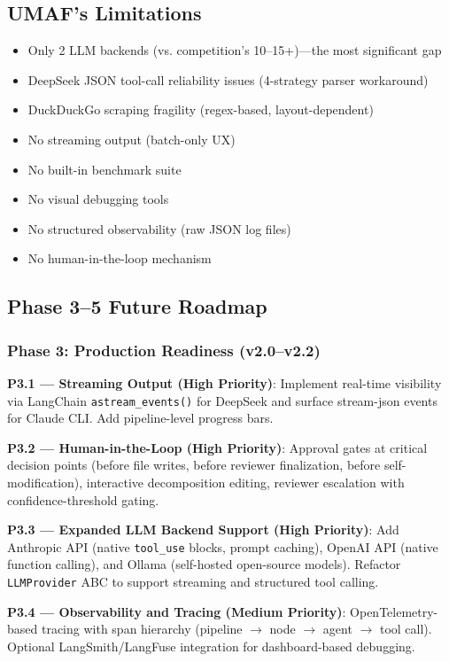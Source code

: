 \subsection{UMAF's Limitations}

\begin{itemize}
    \item Only 2 LLM backends (vs. competition's 10--15+)---the most significant gap
    \item DeepSeek JSON tool-call reliability issues (4-strategy parser workaround)
    \item DuckDuckGo scraping fragility (regex-based, layout-dependent)
    \item No streaming output (batch-only UX)
    \item No built-in benchmark suite
    \item No visual debugging tools
    \item No structured observability (raw JSON log files)
    \item No human-in-the-loop mechanism \cite{defection}
\end{itemize}

\subsection{Phase 3--5 Future Roadmap}

\subsubsection{Phase 3: Production Readiness (v2.0--v2.2)}

\textbf{P3.1 --- Streaming Output (High Priority)}: Implement real-time visibility via LangChain \texttt{astream\_events()} for DeepSeek and surface stream-json events for Claude CLI. Add pipeline-level progress bars.

\textbf{P3.2 --- Human-in-the-Loop (High Priority)}: Approval gates at critical decision points (before file writes, before reviewer finalization, before self-modification), interactive decomposition editing, reviewer escalation with confidence-threshold gating.

\textbf{P3.3 --- Expanded LLM Backend Support (High Priority)}: Add Anthropic API (native \texttt{tool\_use} blocks, prompt caching), OpenAI API (native function calling), and Ollama (self-hosted open-source models). Refactor \texttt{LLMProvider} ABC to support streaming and structured tool calling.

\textbf{P3.4 --- Observability and Tracing (Medium Priority)}: OpenTelemetry-based tracing with span hierarchy (pipeline $\rightarrow$ node $\rightarrow$ agent $\rightarrow$ tool call). Optional LangSmith/LangFuse integration for dashboard-based debugging.

